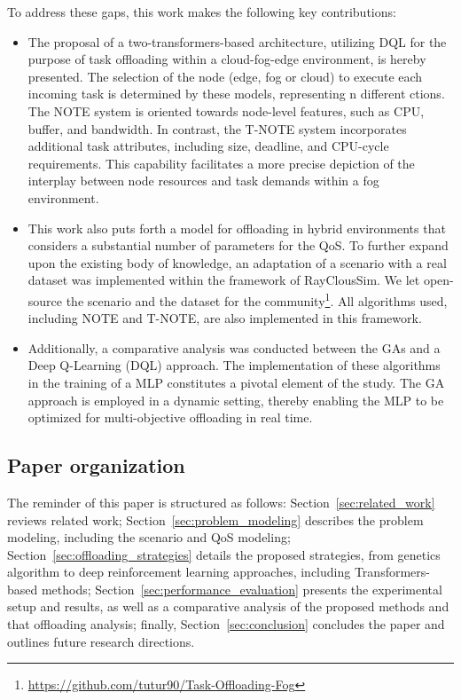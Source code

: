 \documentclass[preprint,3p,authoryear]{elsarticle}
\begin{document}
To address these gaps, this work makes the following key contributions:
\begin{itemize} 
    \item The proposal of a two-transformers-based architecture, utilizing DQL for the purpose of task offloading within a cloud-fog-edge environment, is hereby presented. The selection of the node (edge, fog or cloud) to execute each incoming task is determined by these models, representing n different ctions. The NOTE system is oriented towards node-level features, such as CPU, buffer, and bandwidth. In contrast, the T-NOTE system incorporates additional task attributes, including size, deadline, and CPU-cycle requirements. This capability facilitates a more precise depiction of the interplay between node resources and task demands within a fog environment.

    \item This work also puts forth a model for offloading in hybrid environments that considers a substantial number of parameters for the QoS. To further expand upon the existing body of knowledge, an adaptation of a scenario with a real dataset was implemented within the framework of RayClousSim. We let open-source the scenario and the dataset for the community\footnote{\url{https://github.com/tutur90/Task-Offloading-Fog}}. All algorithms used, including NOTE and T-NOTE, are also implemented in this framework.

    \item Additionally, a comparative analysis was conducted between the GAs and a Deep Q-Learning (DQL) approach. The implementation of these algorithms in the training of a MLP constitutes a pivotal element of the study. The GA approach is employed in a dynamic setting, thereby enabling the MLP to be optimized for multi-objective offloading in real time.

\end{itemize}


\subsection{Paper organization}

The reminder of this paper is structured as follows: Section~\ref{sec:related_work} reviews related work; Section~\ref{sec:problem_modeling} describes the problem modeling, including the scenario and QoS modeling; Section~\ref{sec:offloading_strategies} details the proposed strategies, from genetics algorithm to deep reinforcement learning approaches, including Transformers-based methods; Section~\ref{sec:performance_evaluation} presents the experimental setup and results, as well as a comparative analysis of the proposed methods and that offloading analysis; finally, Section~\ref{sec:conclusion} concludes the paper and outlines future research directions.
\end{document}
